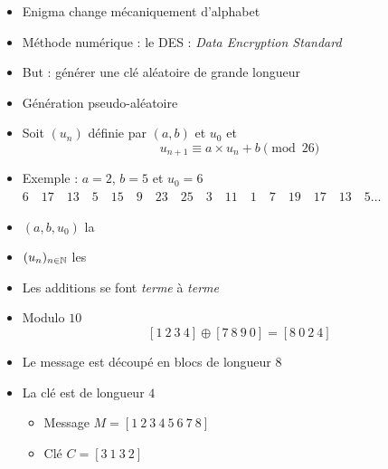 \begin{frame}

\begin{itemize}
  \item Enigma change mécaniquement d'alphabet
\pause  
  \item Méthode numérique : le DES  : \emph{Data Encryption Standard}
\pause  
  \item But : générer une clé aléatoire de grande longueur
\pause 
  \item Génération pseudo-aléatoire
\end{itemize}

\pause 

\begin{exemple}
\begin{itemize}
  \item Soit $(u_n)$  définie par $(a,b)$ et $u_0$ et 
$$u_{n+1} \equiv a\times u_n + b \pmod{26}$$
\vspace*{-4ex}
\pause  
  \item Exemple : $a=2$, $b=5$ et $u_0=6$ \\
\pause  
{\small $6 \quad 17\quad 13\quad 5\quad 15 \quad9\quad 23\quad 25\quad 3 \quad11\quad 1 \quad7\quad 19\quad 17\quad 13\quad 5 \ldots$}
\pause  
  \item $(a,b,u_0)$  la 
\pause  
  \item $(u_n)_{n\in\mathbb{N}}$ les 
\end{itemize}
  
\end{exemple}
\end{frame}


\begin{frame}

\pause  

\begin{itemize} 
  \item Les additions se font \emph{terme} à \emph{terme}
\pause    
  \item Modulo $10$  
\pause    
          $$[1 \ 2 \ 3 \  4] \oplus [7\  8\  9\  0] = [8\  0\  2\  4]$$
\pause    
  \item Le message est découpé en blocs de longueur $8$ 
\pause   
  \item La clé est de longueur $4$
\pause    
\begin{itemize}
  \item Message $M = [1\  2\  3\  4\  5\  6\  7\  8]$ 
\pause    
  \item Clé $C=[3\  1\  3\  2]$
\end{itemize}
\end{itemize}

\end{frame}


